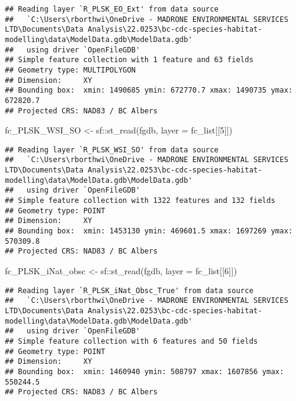 \documentclass[
]{article}
\newenvironment{Shaded}{\begin{snugshade}}{\end{snugshade}}
\newcommand{\AttributeTok}[1]{\textcolor[rgb]{0.77,0.63,0.00}{#1}}
\newcommand{\DecValTok}[1]{\textcolor[rgb]{0.00,0.00,0.81}{#1}}
\newcommand{\FunctionTok}[1]{\textcolor[rgb]{0.00,0.00,0.00}{#1}}
\newcommand{\NormalTok}[1]{#1}
\newcommand{\OtherTok}[1]{\textcolor[rgb]{0.56,0.35,0.01}{#1}}
\newcommand{\SpecialCharTok}[1]{\textcolor[rgb]{0.00,0.00,0.00}{#1}}
\begin{document}
\begin{verbatim}
## Reading layer `R_PLSK_EO_Ext' from data source 
##   `C:\Users\rborthwi\OneDrive - MADRONE ENVIRONMENTAL SERVICES LTD\Documents\Data Analysis\22.0253\bc-cdc-species-habitat-modelling\data\ModelData.gdb\ModelData.gdb' 
##   using driver `OpenFileGDB'
## Simple feature collection with 1 feature and 63 fields
## Geometry type: MULTIPOLYGON
## Dimension:     XY
## Bounding box:  xmin: 1490685 ymin: 672770.7 xmax: 1490735 ymax: 672820.7
## Projected CRS: NAD83 / BC Albers
\end{verbatim}

\begin{Shaded}
\begin{Highlighting}[]
\NormalTok{fc\_PLSK\_WSI\_SO }\OtherTok{\textless{}{-}}\NormalTok{ sf}\SpecialCharTok{::}\FunctionTok{st\_read}\NormalTok{(fgdb, }\AttributeTok{layer =}\NormalTok{ fc\_list[[}\DecValTok{5}\NormalTok{]])}
\end{Highlighting}
\end{Shaded}

\begin{verbatim}
## Reading layer `R_PLSK_WSI_SO' from data source 
##   `C:\Users\rborthwi\OneDrive - MADRONE ENVIRONMENTAL SERVICES LTD\Documents\Data Analysis\22.0253\bc-cdc-species-habitat-modelling\data\ModelData.gdb\ModelData.gdb' 
##   using driver `OpenFileGDB'
## Simple feature collection with 1322 features and 132 fields
## Geometry type: POINT
## Dimension:     XY
## Bounding box:  xmin: 1453130 ymin: 469601.5 xmax: 1697269 ymax: 570309.8
## Projected CRS: NAD83 / BC Albers
\end{verbatim}

\begin{Shaded}
\begin{Highlighting}[]
\NormalTok{fc\_PLSK\_iNat\_obsc }\OtherTok{\textless{}{-}}\NormalTok{ sf}\SpecialCharTok{::}\FunctionTok{st\_read}\NormalTok{(fgdb, }\AttributeTok{layer =}\NormalTok{ fc\_list[[}\DecValTok{6}\NormalTok{]])}
\end{Highlighting}
\end{Shaded}

\begin{verbatim}
## Reading layer `R_PLSK_iNat_Obsc_True' from data source 
##   `C:\Users\rborthwi\OneDrive - MADRONE ENVIRONMENTAL SERVICES LTD\Documents\Data Analysis\22.0253\bc-cdc-species-habitat-modelling\data\ModelData.gdb\ModelData.gdb' 
##   using driver `OpenFileGDB'
## Simple feature collection with 6 features and 50 fields
## Geometry type: POINT
## Dimension:     XY
## Bounding box:  xmin: 1460940 ymin: 508797 xmax: 1607856 ymax: 550244.5
## Projected CRS: NAD83 / BC Albers
\end{verbatim}
\end{document}
